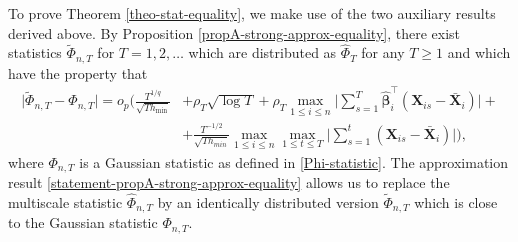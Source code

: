 To prove Theorem \ref{theo-stat-equality}, we make use of the two auxiliary results derived above. By Proposition \ref{propA-strong-approx-equality}, there exist statistics $\widetilde{\Phi}_{n, T}$ for $T = 1,2,\ldots$ which are distributed as $\widehat{\Phi}_T$ for any $T \ge 1$ and which have the property that 
\begin{align}\label{statement-propA-strong-approx-equality}
\big| \widetilde{\Phi}_{n, T} - \Phi_{n,T} \big| = o_p \Big( \frac{T^{1/q}}{\sqrt{T h_{\min}}} &+ \rho_T \sqrt{\log T} + \rho_T\max_{1\le i\le n} \Big|\sum\limits_{s=1}^T \widehat{\bm{\beta}}_i^\top(\mathbf{X}_{is} - \bar{\mathbf{X}}_{i} )\Big| +\nonumber\\
&+ \frac{T^{-1/2}}{\sqrt{Th_{min}}} \max_{1 \le i \le n}\max_{1\le t \le T}\Big|\sum\limits_{s=1}^t (\mathbf{X}_{is} - \bar{\mathbf{X}}_{i} )\Big|  \Big),
\end{align}
where $\Phi_{n, T}$ is a Gaussian statistic as defined in \eqref{Phi-statistic}. The approximation result \eqref{statement-propA-strong-approx-equality} allows us to replace the multiscale statistic $\widehat{\Phi}_{n, T}$ by an identically distributed version $\widetilde{\Phi}_{n, T}$ which is close to the Gaussian statistic $\Phi_{n, T}$.

